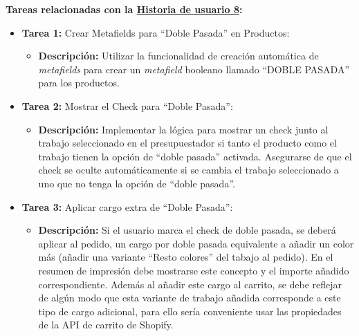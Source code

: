 \documentclass[12pt]{article}
\begin{document}
\textbf{Tareas relacionadas con la \hyperref[sec:historia8]{Historia de usuario 8}:}
\begin{itemize}
    \item \textbf{Tarea 1:} Crear Metafields para ``Doble Pasada'' en Productos:
          \begin{itemize}[label=--]
              \item \textbf{Descripción:} Utilizar la funcionalidad de creación automática de \textit{metafields} para crear un \textit{metafield} booleano llamado ``DOBLE PASADA'' para los productos.
          \end{itemize}
    \item \textbf{Tarea 2:} Mostrar el Check para ``Doble Pasada'':
          \begin{itemize}[label=--]
              \item \textbf{Descripción:} Implementar la lógica para mostrar un check junto al trabajo seleccionado en el presupuestador si tanto el producto como el trabajo tienen la opción de ``doble pasada'' activada. Asegurarse de que el check se oculte automáticamente si se cambia el trabajo seleccionado a uno que no tenga la opción de ``doble pasada''.
          \end{itemize}
    \item \textbf{Tarea 3:} Aplicar cargo extra de ``Doble Pasada'':
          \begin{itemize}[label=--]
              \item \textbf{Descripción:} Si el usuario marca el check de doble pasada, se deberá aplicar al pedido, un cargo por doble pasada equivalente a añadir un color más (añadir una variante ``Resto colores'' del tabajo al pedido). En el resumen de impresión debe mostrarse este concepto y el importe añadido correspondiente. Además al añadir este cargo al carrito, se debe reflejar de algún modo que esta variante de trabajo añadida corresponde a este tipo de cargo adicional, para ello sería conveniente usar las propiedades de la API de carrito de Shopify.
          \end{itemize}
\end{itemize}
\end{document}
